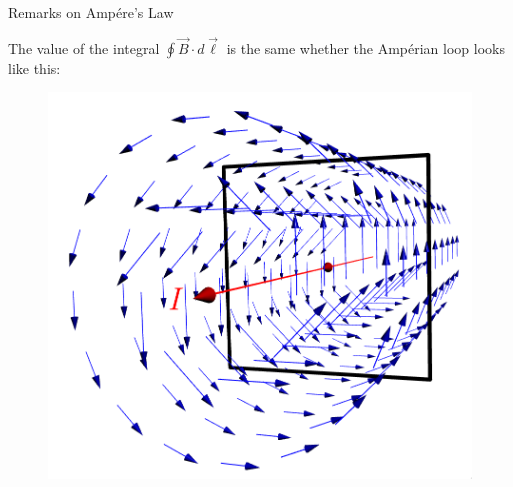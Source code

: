\documentclass{beamer}
\begin{document}
\begin{frame}{Remarks on Amp{\'e}re's Law}

The value of the integral $\displaystyle \oint \vec{B} \cdot d\vec{\ell}$ is the same whether the Amp{\'e}rian loop looks like this:

\begin{figure}[H]
\centering
\includegraphics[height=0.6\textheight]{figures/infwire_loop1.png}
\end{figure}

\end{frame}
\end{document}
